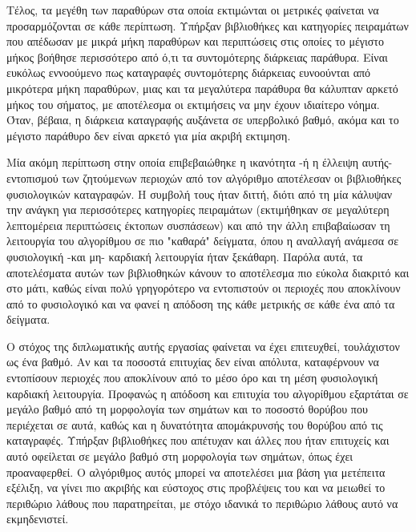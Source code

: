 \par
Τέλος, τα μεγέθη των παραθύρων στα οποία εκτιμώνται οι μετρικές φαίνεται να προσαρμόζονται σε κάθε περίπτωση. Υπήρξαν βιβλιοθήκες και κατηγορίες πειραμάτων που απέδωσαν με μικρά μήκη παραθύρων και περιπτώσεις στις οποίες το μέγιστο μήκος βοήθησε περισσότερο από ό,τι τα συντομότερης διάρκειας παράθυρα. Είναι ευκόλως εννοούμενο πως καταγραφές συντομότερης διάρκειας ευνοούνται από μικρότερα μήκη παραθύρων, μιας και τα μεγαλύτερα παράθυρα θα κάλυπταν αρκετό μήκος του σήματος, με αποτέλεσμα οι εκτιμήσεις να μην έχουν ιδιαίτερο νόημα. Όταν, βέβαια, η διάρκεια καταγραφής αυξάνετα σε υπερβολικό βαθμό, ακόμα και το μέγιστο παράθυρο δεν είναι αρκετό για μία ακριβή εκτιμηση. 
\par
Μία ακόμη περίπτωση στην οποία επιβεβαιώθηκε η ικανότητα -ή η έλλειψη αυτής- εντοπισμού των ζητούμενων περιοχών από τον αλγόριθμο αποτέλεσαν οι βιβλιοθήκες φυσιολογικών καταγραφών. Η συμβολή τους ήταν διττή, διότι από τη μία κάλυψαν την ανάγκη για περισσότερες κατηγορίες πειραμάτων (εκτιμήθηκαν σε μεγαλύτερη λεπτομέρεια περιπτώσεις έκτοπων συσπάσεων) και από την άλλη επιβαβαίωσαν τη λειτουργία του αλγορίθμου σε πιο "καθαρά" δείγματα, όπου η αναλλαγή ανάμεσα σε φυσιολογική -και μη- καρδιακή λειτουργία ήταν ξεκάθαρη. Παρόλα αυτά, τα αποτελέσματα αυτών των βιβλιοθηκών κάνουν το αποτέλεσμα πιο εύκολα διακριτό και στο μάτι, καθώς είναι πολύ γρηγορότερο να εντοπιστούν οι περιοχές που αποκλίνουν από το φυσιολογικό και να φανεί η απόδοση της κάθε μετρικής σε κάθε ένα από τα δείγματα.
\par
Ο στόχος της διπλωματικής αυτής εργασίας φαίνεται να έχει επιτευχθεί, τουλάχιστον ως ένα βαθμό. Αν και τα ποσοστά επιτυχίας δεν είναι απόλυτα, καταφέρνουν να εντοπίσουν περιοχές που αποκλίνουν από το μέσο όρο και τη μέση φυσιολογική καρδιακή λειτουργία. Προφανώς η απόδοση και επιτυχία του αλγορίθμου εξαρτάται σε μεγάλο βαθμό από τη μορφολογία των σημάτων και το ποσοστό θορύβου που περιέχεται σε αυτά, καθώς και η δυνατότητα απομάκρυνσής του θορύβου από τις καταγραφές. Υπήρξαν βιβλιοθήκες που απέτυχαν και άλλες που ήταν επιτυχείς και αυτό οφείλεται σε μεγάλο βαθμό στη μορφολογία των σημάτων, όπως έχει προαναφερθεί. Ο αλγόριθμος αυτός μπορεί να αποτελέσει μια βάση για μετέπειτα εξέλιξη, να γίνει πιο ακριβής και εύστοχος στις προβλέψεις του και να μειωθεί το περιθώριο λάθους που παρατηρείται, με στόχο ιδανικά το περιθώριο λάθους αυτό να εκμηδενιστεί. 